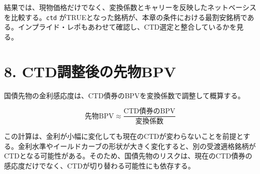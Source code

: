 \documentclass[
  letterpaper,
  DIV=11,
  numbers=noendperiod]{scrreprt}
\begin{document}
結果では、現物価格だけでなく、変換係数とキャリーを反映したネットベーシスを比較する。\texttt{ctd}
がTRUEとなった銘柄が、本章の条件における最割安銘柄である。インプライド・レポもあわせて確認し、CTD選定と整合しているかを見る。

\section{8.
CTD調整後の先物BPV}\label{ctdux8abfux6574ux5f8cux306eux5148ux7269bpv}

国債先物の金利感応度は、CTD債券のBPVを変換係数で調整して概算する。

\[
\text{先物BPV}
\approx
\frac{\text{CTD債券のBPV}}
{\text{変換係数}}
\]

この計算は、金利が小幅に変化しても現在のCTDが変わらないことを前提とする。金利水準やイールドカーブの形状が大きく変化すると、別の受渡適格銘柄がCTDとなる可能性がある。そのため、国債先物のリスクは、現在のCTD債券の感応度だけでなく、CTDが切り替わる可能性にも依存する。
\end{document}

